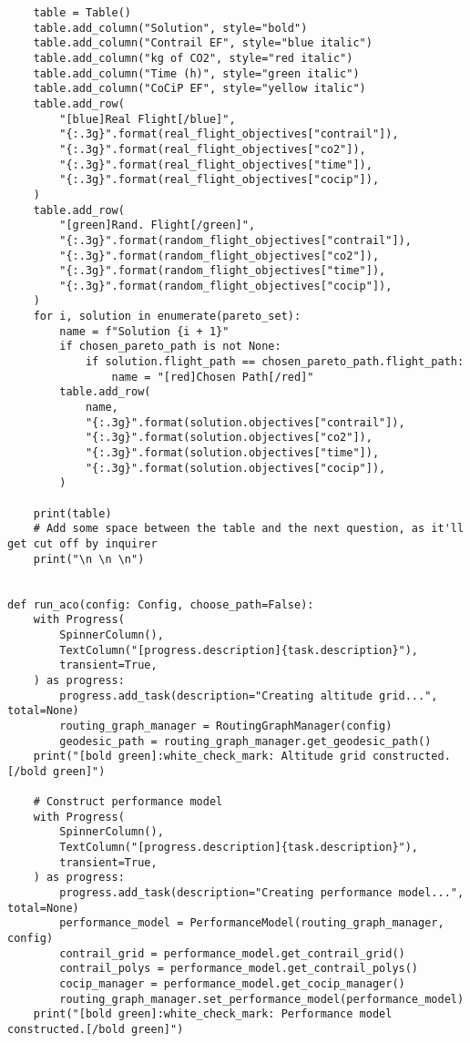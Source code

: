 \begin{verbatim}
    table = Table()
    table.add_column("Solution", style="bold")
    table.add_column("Contrail EF", style="blue italic")
    table.add_column("kg of CO2", style="red italic")
    table.add_column("Time (h)", style="green italic")
    table.add_column("CoCiP EF", style="yellow italic")
    table.add_row(
        "[blue]Real Flight[/blue]",
        "{:.3g}".format(real_flight_objectives["contrail"]),
        "{:.3g}".format(real_flight_objectives["co2"]),
        "{:.3g}".format(real_flight_objectives["time"]),
        "{:.3g}".format(real_flight_objectives["cocip"]),
    )
    table.add_row(
        "[green]Rand. Flight[/green]",
        "{:.3g}".format(random_flight_objectives["contrail"]),
        "{:.3g}".format(random_flight_objectives["co2"]),
        "{:.3g}".format(random_flight_objectives["time"]),
        "{:.3g}".format(random_flight_objectives["cocip"]),
    )
    for i, solution in enumerate(pareto_set):
        name = f"Solution {i + 1}"
        if chosen_pareto_path is not None:
            if solution.flight_path == chosen_pareto_path.flight_path:
                name = "[red]Chosen Path[/red]"
        table.add_row(
            name,
            "{:.3g}".format(solution.objectives["contrail"]),
            "{:.3g}".format(solution.objectives["co2"]),
            "{:.3g}".format(solution.objectives["time"]),
            "{:.3g}".format(solution.objectives["cocip"]),
        )

    print(table)
    # Add some space between the table and the next question, as it'll get cut off by inquirer
    print("\n \n \n")


def run_aco(config: Config, choose_path=False):
    with Progress(
        SpinnerColumn(),
        TextColumn("[progress.description]{task.description}"),
        transient=True,
    ) as progress:
        progress.add_task(description="Creating altitude grid...", total=None)
        routing_graph_manager = RoutingGraphManager(config)
        geodesic_path = routing_graph_manager.get_geodesic_path()
    print("[bold green]:white_check_mark: Altitude grid constructed.[/bold green]")

    # Construct performance model
    with Progress(
        SpinnerColumn(),
        TextColumn("[progress.description]{task.description}"),
        transient=True,
    ) as progress:
        progress.add_task(description="Creating performance model...", total=None)
        performance_model = PerformanceModel(routing_graph_manager, config)
        contrail_grid = performance_model.get_contrail_grid()
        contrail_polys = performance_model.get_contrail_polys()
        cocip_manager = performance_model.get_cocip_manager()
        routing_graph_manager.set_performance_model(performance_model)
    print("[bold green]:white_check_mark: Performance model constructed.[/bold green]")


\end{verbatim}

